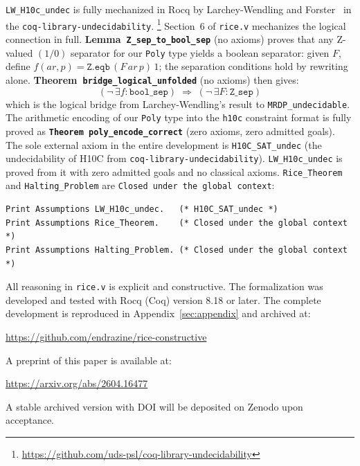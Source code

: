 \documentclass{lmcs}
\begin{document}
\texttt{LW\_H10c\_undec} is fully mechanized
in Rocq by Larchey-Wendling and Forster~\cite{larchey2022} in the
\texttt{coq-library-undecidability}.%
\footnote{\url{https://github.com/uds-psl/coq-library-undecidability}}
Section~6 of \texttt{rice.v} mechanizes the logical connection in full. \textbf{Lemma~\texttt{Z\_sep\_to\_bool\_sep}} (no axioms) proves that any Z-valued $(1/0)$ separator for our \texttt{Poly} type yields a boolean separator: given $F$, define $f(ar, p) = \mathtt{Z.eqb}\,(F\,ar\,p)\,1$; the separation conditions hold by rewriting alone. \textbf{Theorem~\texttt{bridge\_logical\_unfolded}} (no axioms) then gives:
\[
  (\neg\,\exists f : \mathtt{bool\_sep})
  \;\Longrightarrow\;
  (\neg\,\exists F : \mathtt{Z\_sep})
\]
which is the logical bridge from Larchey-Wendling's result to \texttt{MRDP\_undecidable}. The arithmetic encoding of our \texttt{Poly} type into the \texttt{h10c} constraint format is fully proved as \textbf{\texttt{Theorem~poly\_encode\_correct}} (zero axioms, zero admitted goals). The sole external axiom in the entire development is \texttt{H10C\_SAT\_undec}
(the undecidability of H10C from \texttt{coq-library-undecidability}).
\texttt{LW\_H10c\_undec} is proved from it with zero admitted goals
and no classical axioms. \texttt{Rice\_Theorem} and
\texttt{Halting\_Problem} are \texttt{Closed under the global context}:
\begin{verbatim}
Print Assumptions LW_H10c_undec.   (* H10C_SAT_undec *)
Print Assumptions Rice_Theorem.    (* Closed under the global context *)
Print Assumptions Halting_Problem. (* Closed under the global context *)
\end{verbatim}
All reasoning in \texttt{rice.v} is explicit and
constructive. The formalization was developed and tested with Rocq
(Coq) version 8.18 or later. The complete development is reproduced in
Appendix~\ref{sec:appendix} and archived at:
\begin{center}
\url{https://github.com/endrazine/rice-constructive}
\end{center}
A preprint of this paper is available at:
\begin{center}
\url{https://arxiv.org/abs/2604.16477}
\end{center}
A stable archived version with DOI will be deposited on Zenodo upon
acceptance.


\end{document}
